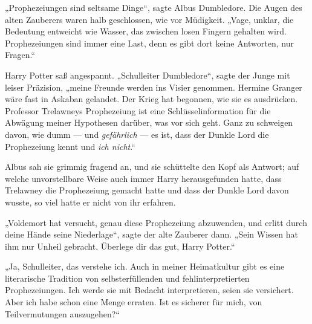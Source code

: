 „Prophezeiungen sind seltsame Dinge“, sagte Albus Dumbledore. Die Augen des alten Zauberers waren halb geschlossen, wie vor Müdigkeit.
„Vage, unklar, die Bedeutung entweicht wie Wasser, das zwischen losen Fingern gehalten wird. Prophezeiungen sind immer eine Last, denn es gibt dort keine Antworten, nur Fragen.“

Harry Potter saß angespannt.
„Schulleiter Dumbledore“, sagte der Junge mit leiser Präzision, „meine Freunde werden ins Visier genommen. Hermine Granger wäre fast in Askaban gelandet. Der Krieg hat begonnen, wie sie es ausdrücken. Professor Trelawneys Prophezeiung ist eine Schlüsselinformation für die Abwägung meiner Hypothesen darüber, was vor sich geht. Ganz zu schweigen davon, wie dumm — und \emph{gefährlich} — es ist, dass der Dunkle Lord die Prophezeiung kennt und \emph{ich nicht}.“

Albus sah sie grimmig fragend an, und sie schüttelte den Kopf als Antwort; auf welche unvorstellbare Weise auch immer Harry herausgefunden hatte, dass Trelawney die Prophezeiung gemacht hatte und dass der Dunkle Lord davon wusste, so viel hatte er nicht von ihr erfahren.

„Voldemort hat versucht, genau diese Prophezeiung abzuwenden, und erlitt durch deine Hände seine Niederlage“, sagte der alte Zauberer dann.
„Sein Wissen hat ihm nur Unheil gebracht. Überlege dir das gut, Harry Potter.“

„Ja, Schulleiter, das verstehe ich. Auch in meiner Heimatkultur gibt es eine literarische Tradition von selbsterfüllenden und fehlinterpretierten Prophezeiungen. Ich werde sie mit Bedacht interpretieren, seien sie versichert. Aber ich habe schon eine Menge erraten. Ist es sicherer für mich, von Teilvermutungen auszugehen?“


